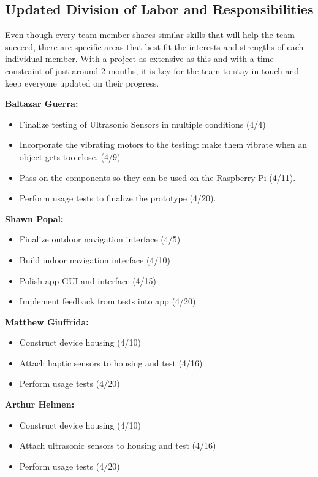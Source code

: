 \documentclass[letterpaper,12pt]{article}
\begin{document}
\subsection{Updated Division of Labor and Responsibilities}
Even though every team member shares similar skills that will help the team succeed, there are specific areas that best fit the interests and strengths of each individual member. With a project as extensive as this and with a time constraint of just around 2 months, it is key for the team to stay in touch and keep everyone updated on their progress. \newline\par

\textbf{Baltazar Guerra:}
\begin{itemize}
    \item Finalize testing of Ultrasonic Sensors in multiple conditions (4/4)
    \item Incorporate the vibrating motors to the testing: make them vibrate when an object gets too close. (4/9)
    \item Pass on the components so they can be used on the Raspberry Pi (4/11).
    \item Perform usage tests to finalize the prototype (4/20).
\end{itemize}

\textbf{Shawn Popal:}
\begin{itemize}
    \item Finalize outdoor navigation interface (4/5)
    \item Build indoor navigation interface (4/10)
    \item Polish app GUI and interface (4/15)
    \item Implement feedback from tests into app (4/20)
\end{itemize}

\textbf{Matthew Giuffrida:} 
\begin{itemize}
    \item Construct device housing (4/10)
    \item Attach haptic sensors to housing and test (4/16)
    \item Perform usage tests (4/20)
\end{itemize}

\textbf{Arthur Helmen:}
\begin{itemize}
    \item Construct device housing (4/10)
    \item Attach ultrasonic sensors to housing and test (4/16)
    \item Perform usage tests (4/20)
\end{itemize}
\end{document}
